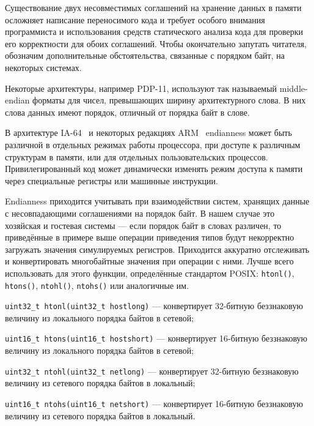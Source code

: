 Существование двух несовместимых соглашений на хранение данных в памяти осложняет написание переносимого кода и требует особого внимания программиста и использования средств статического анализа кода для проверки его корректности для обоих соглашений. Чтобы окончательно запутать читателя, обозначим дополнительные обстоятельства, связанные с порядком байт, на некоторых системах.

\begin{itemize*}
    \item Некоторые архитектуры, например PDP-11, используют так называемый middle-endian форматы для чисел, превышающих ширину архитектурного слова. В них слова данных имеют порядок, отличный от порядка байт в слове.
    \item В архитектуре IA-64~\cite{itanium-sdm} и некоторых редакциях ARM~\cite{arm-sdg} endianness может быть различной в отдельных режимах работы процессора, при доступе к различным структурам в памяти, или для отдельных пользовательских процессов. Привилегированный код может динамически изменять режим доступа к памяти через специальные регистры или машинные инструкции.
\end{itemize*}

Endianness приходится учитывать при взаимодействии систем, хранящих данные с несовпадающими соглашениями на порядок байт. В нашем случае это хозяйская и гостевая системы — если порядок байт в словах различен, то приведённые в примере выше операции приведения типов будут некорректно загружать значения симулируемых регистров. Приходится аккуратно отслеживать и конвертировать многобайтные значения при операции с ними. Лучше всего использовать для этого функции, определённые стандартом POSIX: \texttt{htonl()}, \texttt{htons()}, \texttt{ntohl()}, \texttt{ntohs()} или аналогичные им.

\begin{itemize*}
\item \texttt{uint32_t htonl(uint32_t hostlong)} — конвертирует 32-битную беззнаковую величину из локального порядка байтов в сетевой;
\item \texttt{uint16_t htons(uint16_t hostshort)} — конвертирует 16-битную беззнаковую величину из локального порядка байтов в сетевой;
\item \texttt{uint32_t ntohl(uint32_t netlong)} — конвертирует 32-битную беззнаковую величину из сетевого порядка байтов в локальный;
\item \texttt{uint16_t ntohs(uint16_t netshort)} — конвертирует 16-битную беззнаковую величину из сетевого порядка байтов в локальный.
\end{itemize*}

